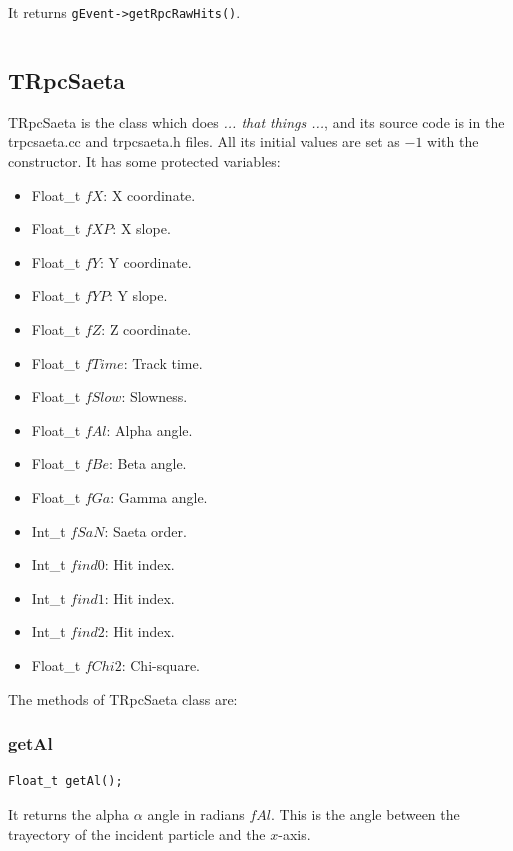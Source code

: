 \documentclass[a4paper]{book}
\begin{document}
It returns \texttt{gEvent->getRpcRawHits()}.

\[\]

\subsection{TRpcSaeta}

TRpcSaeta is the class which does \textit{... that things ...}, and its source code is in the trpcsaeta.cc and trpcsaeta.h files. All its initial values are set as $-1$ with the constructor. It has some protected variables:

\begin{itemize}
	\item Float\_t $fX$: X coordinate.
	\item Float\_t $fXP$: X slope.
	\item Float\_t $fY$: Y coordinate.
	\item Float\_t $fYP$: Y slope.
	\item Float\_t $fZ$: Z coordinate.
	\item Float\_t $fTime$: Track time.
	\item Float\_t $fSlow$: Slowness.
	\item Float\_t $fAl$: Alpha angle.
	\item Float\_t $fBe$: Beta angle.
	\item Float\_t $fGa$: Gamma angle.
	\item Int\_t   $fSaN$: Saeta order.
	\item Int\_t   $find0$: Hit index.
	\item Int\_t   $find1$: Hit index.
	\item Int\_t   $find2$: Hit index.
	\item Float\_t $fChi2$: Chi-square.
\end{itemize}

The methods of TRpcSaeta class are:

\subsubsection{getAl}

\begin{lstlisting}[style=customc]
Float_t getAl();
\end{lstlisting}

It returns the alpha $\alpha$ angle in radians $fAl$. This is the angle between the trayectory of the incident particle and the $x$-axis.

\[\]
\end{document}
